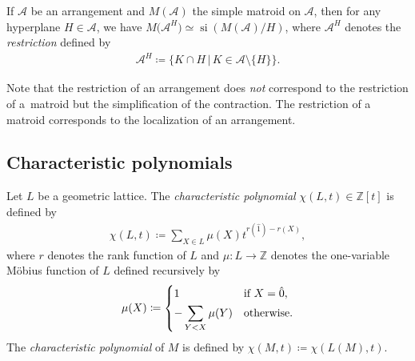\documentclass[11pt]{article}
\DeclareMathOperator{\si}{si}
\begin{document}
If $ \mathcal{A} $ be an arrangement and $ M(\mathcal{A}) $ the simple matroid on $ \mathcal{A} $, then for any hyperplane $ H \in \mathcal{A} $, we have $ M\big(\mathcal{A}^{H}\big) \simeq \si(M(\mathcal{A})/H) $, where $ \mathcal{A}^{H} $ denotes the \textit{restriction} defined by
\begin{gather*}
\mathcal{A}^{H} \coloneqq \{ K \cap H \,|\, K \in \mathcal{A}\setminus\{H\}\}.
\end{gather*}

Note that the restriction of an arrangement does \emph{not} correspond to the restriction of a~matroid but the simplification of the contraction.
The restriction of a matroid corresponds to the localization of an arrangement.

\subsection{Characteristic polynomials}

Let $ L $ be a geometric lattice.
The \textit{characteristic polynomial} $ \chi(L,t) \in \mathbb{Z}[t] $ is defined by
\begin{gather*}
\chi(L,t) \coloneqq \sum_{X \in L}\mu(X)t^{r(\hat{1}) - r(X)},
\end{gather*}
where $ r $ denotes the rank function of $ L $ and $ \mu \colon L \to \mathbb{Z} $ denotes the one-variable M\"{o}bius function of $ L $ defined recursively by{\samepage
\begin{gather*}
\mu(X) \coloneqq \begin{cases}
 1 & \text{if } X = \hat{0}, \vspace{1mm}\\
-\displaystyle\sum_{Y < X}\mu(Y) & \text{otherwise.}
\end{cases}
\end{gather*}
The \textit{characteristic polynomial} of $ M $ is defined by $ \chi(M,t) \coloneqq \chi(L(M),t) $.}
\end{document}
